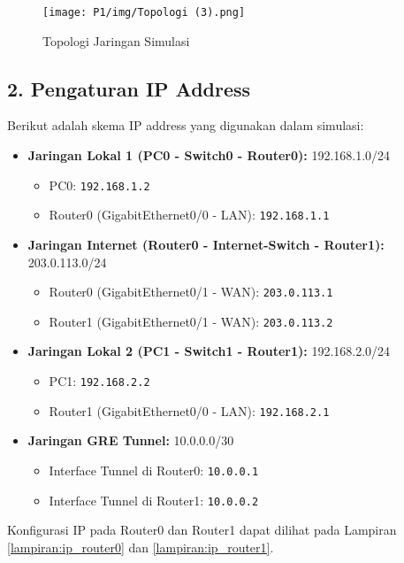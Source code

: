 \begin{figure}[h!]
    \centering
    \texttt{[image: P1/img/Topologi (3).png]} 
    \caption{Topologi Jaringan Simulasi}
    \label{fig:topologi}
\end{figure}

\subsection*{2. Pengaturan IP Address}
Berikut adalah skema IP address yang digunakan dalam simulasi:
\begin{itemize}
    \item \textbf{Jaringan Lokal 1 (PC0 - Switch0 - Router0):} 192.168.1.0/24
    \begin{itemize}
        \item PC0: \texttt{192.168.1.2}
        \item Router0 (GigabitEthernet0/0 - LAN): \texttt{192.168.1.1}
    \end{itemize}
    \item \textbf{Jaringan Internet (Router0 - Internet-Switch - Router1):} 203.0.113.0/24
    \begin{itemize}
        \item Router0 (GigabitEthernet0/1 - WAN): \texttt{203.0.113.1}
        \item Router1 (GigabitEthernet0/1 - WAN): \texttt{203.0.113.2}
    \end{itemize}
    \item \textbf{Jaringan Lokal 2 (PC1 - Switch1 - Router1):} 192.168.2.0/24
    \begin{itemize}
        \item PC1: \texttt{192.168.2.2}
        \item Router1 (GigabitEthernet0/0 - LAN): \texttt{192.168.2.1}
    \end{itemize}
    \item \textbf{Jaringan GRE Tunnel:} 10.0.0.0/30
    \begin{itemize}
        \item Interface Tunnel di Router0: \texttt{10.0.0.1}
        \item Interface Tunnel di Router1: \texttt{10.0.0.2}
    \end{itemize}
\end{itemize}

Konfigurasi IP pada Router0 dan Router1 dapat dilihat pada Lampiran \ref{lampiran:ip_router0} dan \ref{lampiran:ip_router1}.

